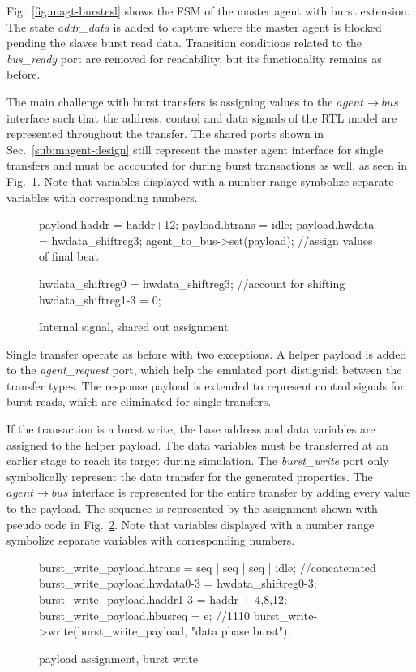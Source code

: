 Fig.~\ref{fig:magt-burstesl} shows the FSM of the master agent with burst extension. The state \textit{addr\_data} is added to capture where the master agent is blocked pending the slaves burst read data. Transition conditions related to the \textit{bus\_ready} port are removed for readability, but its functionality remains as before. \par
The main challenge with burst transfers is assigning values to the $agent\rightarrow bus$ interface such that the address, control and data signals of the RTL model are represented throughout the transfer. The shared ports shown in Sec.~\ref{sub:magent-design} still represent the master agent interface for single transfers and must be accounted for during burst transactions as well, as seen in Fig.~\ref{fig:var-assign}. Note that variables displayed with a number range symbolize separate variables with corresponding numbers.
\newpage
\begin{figure}[h!]
\begin{C++}
payload.haddr = haddr+12;
payload.htrans = idle;
payload.hwdata = hwdata_shiftreg3;
agent_to_bus->set(payload); //assign values of final beat 

hwdata_shiftreg0 = hwdata_shiftreg3; //account for shifting
hwdata_shiftreg1-3 = 0;
\end{C++}
\caption{Internal signal, shared out assignment}
\label{fig:var-assign}
\end{figure} 


Single transfer operate as before with two exceptions. A helper payload is added to the \textit{agent\_request} port, which help the emulated port distiguish between the transfer types. The response payload is extended to represent control signals for burst reads, which are eliminated for single transfers. \par
If the transaction is a burst write, the base address and data variables are assigned to the helper payload. The data variables must be transferred at an earlier stage to reach its target during simulation. The \textit{burst\_write} port only symbolically represent the data transfer for the generated properties. The $agent\rightarrow bus$ interface is represented for the entire transfer by adding every value to the payload. The sequence is represented by the assignment shown with pseudo code in Fig.~\ref{fig:burst-write-sequence}. Note that variables displayed with a number range symbolize separate variables with corresponding numbers.        

\begin{figure}[h!]
\begin{C++}
burst_write_payload.htrans = seq | seq | seq | idle; //concatenated
burst_write_payload.hwdata0-3 = hwdata_shiftreg0-3;
burst_write_payload.haddr1-3 = haddr + 4,8,12; 
burst_write_payload.hbusreq = e; //1110
burst_write->write(burst_write_payload, "data phase burst");
\end{C++}
\caption{payload assignment, burst write}
\label{fig:burst-write-sequence}
\end{figure}


